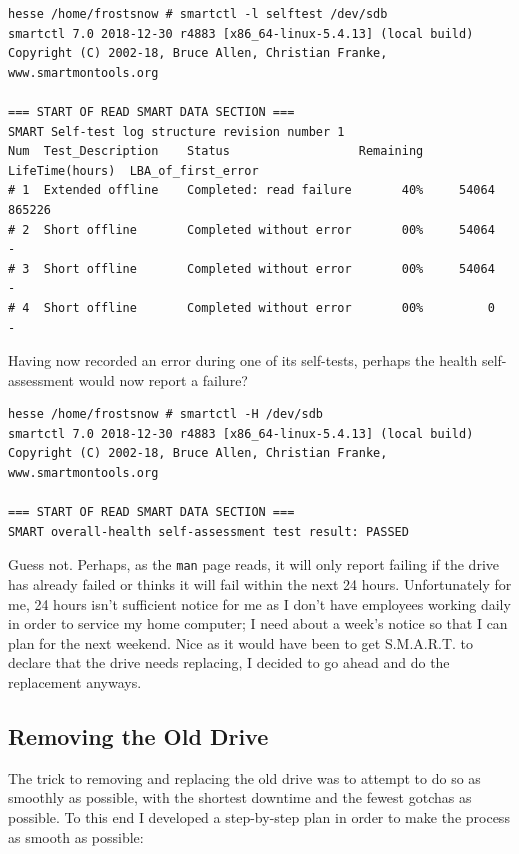 \documentclass{article}
\begin{document}
\begin{verbatim}
hesse /home/frostsnow # smartctl -l selftest /dev/sdb
smartctl 7.0 2018-12-30 r4883 [x86_64-linux-5.4.13] (local build)
Copyright (C) 2002-18, Bruce Allen, Christian Franke, www.smartmontools.org

=== START OF READ SMART DATA SECTION ===
SMART Self-test log structure revision number 1
Num  Test_Description    Status                  Remaining  LifeTime(hours)  LBA_of_first_error
# 1  Extended offline    Completed: read failure       40%     54064         865226
# 2  Short offline       Completed without error       00%     54064         -
# 3  Short offline       Completed without error       00%     54064         -
# 4  Short offline       Completed without error       00%         0         -
\end{verbatim}

Having now recorded an error during one of its self-tests, perhaps the health self-assessment would now report a failure?

\begin{verbatim}
hesse /home/frostsnow # smartctl -H /dev/sdb
smartctl 7.0 2018-12-30 r4883 [x86_64-linux-5.4.13] (local build)
Copyright (C) 2002-18, Bruce Allen, Christian Franke, www.smartmontools.org

=== START OF READ SMART DATA SECTION ===
SMART overall-health self-assessment test result: PASSED
\end{verbatim}

Guess not.  Perhaps, as the \texttt{man} page reads, it will only report failing if the drive has already failed or thinks it will fail within the next 24 hours.  Unfortunately for me, 24 hours isn't sufficient notice for me as I don't have employees working daily in order to service my home computer; I need about a week's notice so that I can plan for the next weekend.  Nice as it would have been to get S.M.A.R.T. to declare that the drive needs replacing, I decided to go ahead and do the replacement anyways.

\subsection{Removing the Old Drive}

The trick to removing and replacing the old drive was to attempt to do so as smoothly as possible, with the shortest downtime and the fewest gotchas as possible.  To this end I developed a step-by-step plan in order to make the process as smooth as possible:
\end{document}
